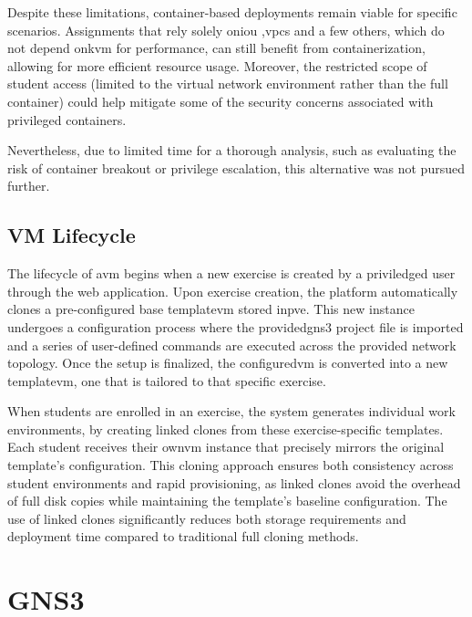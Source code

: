             Despite these limitations, container-based deployments remain viable for specific scenarios. Assignments that rely solely on\ac{iou} 
            ,\ac{vpcs} and a few others, which do not depend on\ac{kvm} for performance, can still benefit from containerization, allowing for 
            more efficient resource usage. Moreover, the restricted scope of student access (limited to the virtual network environment rather 
            than the full container) could help mitigate some of the security concerns associated with privileged containers.

            Nevertheless, due to limited time for a thorough analysis, such as evaluating the risk of container breakout or privilege escalation, 
            this alternative was not pursued further.

    \subsection{VM Lifecycle}

        The lifecycle of a\ac{vm} begins when a new exercise is created by a priviledged user through the web application. 
        Upon exercise creation, the platform automatically clones a pre-configured base template\ac{vm} stored in\ac{pve}. This new instance 
        undergoes a configuration process where the provided\ac{gns3} project file is imported and a series of user-defined commands are executed 
        across the provided network topology. Once the setup is finalized, the configured\ac{vm} is converted into a new template\ac{vm}, one that 
        is tailored to that specific exercise.

        When students are enrolled in an exercise, the system generates individual work environments, by creating linked clones from these 
        exercise-specific templates. Each student receives their own\ac{vm} instance that precisely mirrors the original template's 
        configuration. This cloning approach ensures both consistency across student environments and rapid provisioning, as linked clones 
        avoid the overhead of full disk copies while maintaining the template's baseline configuration. The use of linked clones significantly 
        reduces both storage requirements and deployment time compared to traditional full cloning methods.
        
\section{GNS3}

